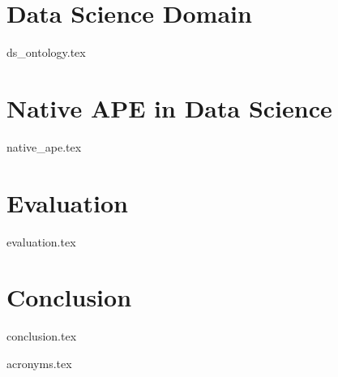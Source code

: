 \documentclass[12pt,twoside]{book}
\theoremstyle{definition}
\begin{document}
\chapter{Data Science Domain}\label{ch:ds_ontoloty}
{ds_ontology.tex}

\chapter{Native APE in Data Science}\label{ch:native_ape}
{native_ape.tex}

\chapter{Evaluation}\label{ch:evaluation}
{evaluation.tex}

\chapter{Conclusion}\label{ch:conclusion}
{conclusion.tex}

{acronyms.tex}

\backmatter
\printbibliography[heading=bibintoc]
\end{document}
